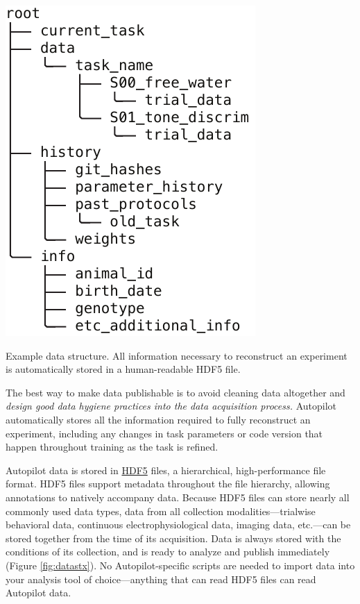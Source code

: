 \begin{marginfigure}[0.5cm]
\includegraphics[]{figures/side_16_data.pdf}
\caption{Example data structure. All information necessary to reconstruct an experiment is automatically stored in a human-readable HDF5 file.}
\label{fig:datastx}
\end{marginfigure}

The best way to make data publishable is to avoid cleaning data altogether and \textit{design good data hygiene practices into the data acquisition process.} Autopilot automatically stores all the information required to fully reconstruct an experiment, including any changes in task parameters or code version that happen throughout training as the task is refined.

Autopilot data is stored in \href{https://support.hdfgroup.org/HDF5/whatishdf5.html}{HDF5} files, a hierarchical, high-performance file format. HDF5 files support metadata throughout the file hierarchy, allowing annotations to natively accompany data. Because HDF5 files can store nearly all commonly used data types, data from all collection modalities---trialwise behavioral data, continuous electrophysiological data, imaging data, etc.---can be stored together from the time of its acquisition. Data is always stored with the conditions of its collection, and is ready to analyze and publish immediately (Figure \ref{fig:datastx}). No Autopilot-specific scripts are needed to import data into your analysis tool of choice---anything that can read HDF5 files can read Autopilot data. 

